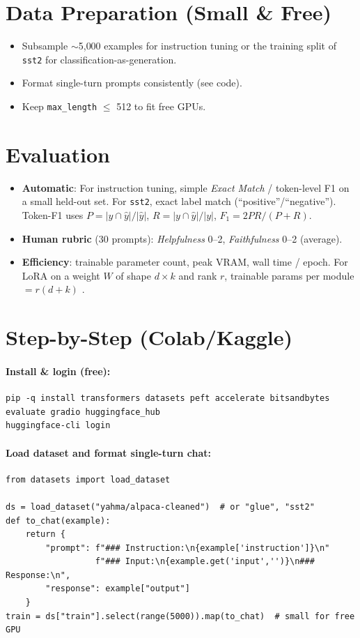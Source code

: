 \documentclass[11pt]{article}
\begin{document}
\section*{Data Preparation (Small \& Free)}
\begin{itemize}
  \item Subsample $\sim$5{,}000 examples for instruction tuning or the training split of \texttt{sst2} for classification-as-generation.
  \item Format single-turn prompts consistently (see code).
  \item Keep \texttt{max\_length} $\leq$ 512 to fit free GPUs.
\end{itemize}

\section*{Evaluation}
\begin{itemize}
  \item \textbf{Automatic}: For instruction tuning, simple \emph{Exact Match} / token-level F1 on a small held-out set. For \texttt{sst2}, exact label match (``positive''/``negative''). Token-F1 uses $P=|y\cap\hat y|/|\hat y|$, $R=|y\cap\hat y|/|y|$, $F_1=2PR/(P{+}R)$.
  \item \textbf{Human rubric} (30 prompts): \emph{Helpfulness} 0--2, \emph{Faithfulness} 0--2 (average).
  \item \textbf{Efficiency}: trainable parameter count, peak VRAM, wall time / epoch. For LoRA on a weight $W$ of shape $d\times k$ and rank $r$, trainable params per module $=r(d{+}k)$ \cite{hu2021lora}.
\end{itemize}

\section*{Step-by-Step (Colab/Kaggle)}
\paragraph{Install \& login (free):}
\begin{lstlisting}[style=bash]
pip -q install transformers datasets peft accelerate bitsandbytes evaluate gradio huggingface_hub
huggingface-cli login
\end{lstlisting}

\paragraph{Load dataset and format single-turn chat:}
\begin{lstlisting}[style=py]
from datasets import load_dataset

ds = load_dataset("yahma/alpaca-cleaned")  # or "glue", "sst2"
def to_chat(example):
    return {
        "prompt": f"### Instruction:\n{example['instruction']}\n"
                  f"### Input:\n{example.get('input','')}\n### Response:\n",
        "response": example["output"]
    }
train = ds["train"].select(range(5000)).map(to_chat)  # small for free GPU
\end{lstlisting}
\end{document}
